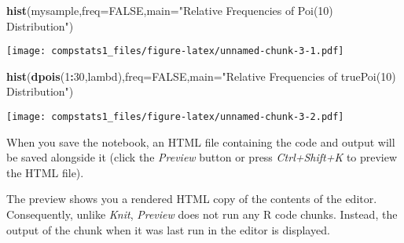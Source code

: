 \documentclass[
]{article}
\newenvironment{Shaded}{\begin{snugshade}}{\end{snugshade}}
\newcommand{\DataTypeTok}[1]{\textcolor[rgb]{0.13,0.29,0.53}{#1}}
\newcommand{\DecValTok}[1]{\textcolor[rgb]{0.00,0.00,0.81}{#1}}
\newcommand{\KeywordTok}[1]{\textcolor[rgb]{0.13,0.29,0.53}{\textbf{#1}}}
\newcommand{\NormalTok}[1]{#1}
\newcommand{\OperatorTok}[1]{\textcolor[rgb]{0.81,0.36,0.00}{\textbf{#1}}}
\newcommand{\OtherTok}[1]{\textcolor[rgb]{0.56,0.35,0.01}{#1}}
\newcommand{\StringTok}[1]{\textcolor[rgb]{0.31,0.60,0.02}{#1}}
\begin{document}
\begin{Shaded}
\begin{Highlighting}[]
\KeywordTok{hist}\NormalTok{(mysample,}\DataTypeTok{freq=}\OtherTok{FALSE}\NormalTok{,}\DataTypeTok{main=}\StringTok{"Relative Frequencies of Poi(10) Distribution"}\NormalTok{)}
\end{Highlighting}
\end{Shaded}

\texttt{[image: compstats1\_files/figure-latex/unnamed-chunk-3-1.pdf]}

\begin{Shaded}
\begin{Highlighting}[]
\KeywordTok{hist}\NormalTok{(}\KeywordTok{dpois}\NormalTok{(}\DecValTok{1}\OperatorTok{:}\DecValTok{30}\NormalTok{,lambd),}\DataTypeTok{freq=}\OtherTok{FALSE}\NormalTok{,}\DataTypeTok{main=}\StringTok{"Relative Frequencies of truePoi(10) Distribution"}\NormalTok{)}
\end{Highlighting}
\end{Shaded}

\texttt{[image: compstats1\_files/figure-latex/unnamed-chunk-3-2.pdf]}

When you save the notebook, an HTML file containing the code and output
will be saved alongside it (click the \emph{Preview} button or press
\emph{Ctrl+Shift+K} to preview the HTML file).

The preview shows you a rendered HTML copy of the contents of the
editor. Consequently, unlike \emph{Knit}, \emph{Preview} does not run
any R code chunks. Instead, the output of the chunk when it was last run
in the editor is displayed.
\end{document}

